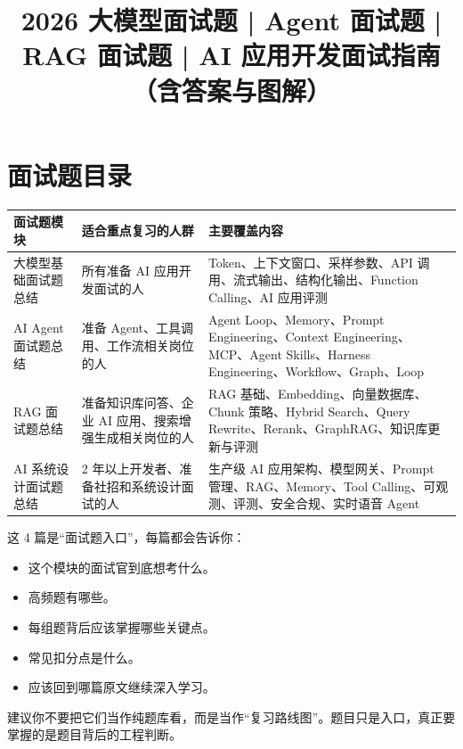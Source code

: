 \documentclass[9pt,a4paper,twocolumn]{ctexart}
\begin{document}
\title{2026 大模型面试题 | Agent 面试题 | RAG 面试题 | AI 应用开发面试指南（含答案与图解）}
\date{}
\maketitle
{}

\section*{面试题目录}

{\footnotesize
\begin{tabular}{|p{}|p{}|p{}|}
\hline
\textbf{面试题模块} & \textbf{适合重点复习的人群} & \textbf{主要覆盖内容} \\
\hline
大模型基础面试题总结 & 所有准备 AI 应用开发面试的人 & Token、上下文窗口、采样参数、API 调用、流式输出、结构化输出、Function Calling、AI 应用评测 \\
\hline
AI Agent 面试题总结 & 准备 Agent、工具调用、工作流相关岗位的人 & Agent Loop、Memory、Prompt Engineering、Context Engineering、MCP、Agent Skills、Harness Engineering、Workflow、Graph、Loop \\
\hline
RAG 面试题总结 & 准备知识库问答、企业 AI 应用、搜索增强生成相关岗位的人 & RAG 基础、Embedding、向量数据库、Chunk 策略、Hybrid Search、Query Rewrite、Rerank、GraphRAG、知识库更新与评测 \\
\hline
AI 系统设计面试题总结 & 2 年以上开发者、准备社招和系统设计面试的人 & 生产级 AI 应用架构、模型网关、Prompt 管理、RAG、Memory、Tool Calling、可观测、评测、安全合规、实时语音 Agent \\
\hline
\end{tabular}
}



这 4 篇是“面试题入口”，每篇都会告诉你：


\begin{itemize}[itemsep=1pt, topsep=2pt]
  \item 这个模块的面试官到底想考什么。
  \item 高频题有哪些。
  \item 每组题背后应该掌握哪些关键点。
  \item 常见扣分点是什么。
  \item 应该回到哪篇原文继续深入学习。
\end{itemize}


建议你不要把它们当作纯题库看，而是当作“复习路线图”。题目只是入口，真正要掌握的是题目背后的工程判断。
\end{document}
